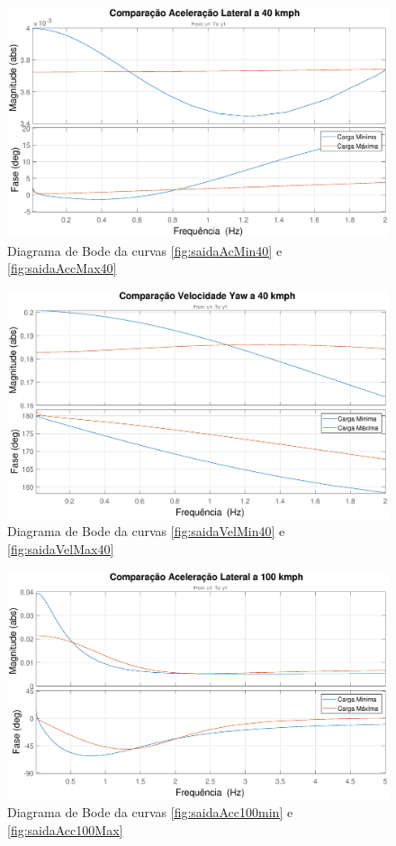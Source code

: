 \documentclass[a4paper, 12pt]{article}
\begin{document}
\begin{figure}[H]
\centering
\includegraphics[width=13cm]{imagens/acc40.eps}
\caption{Diagrama de Bode da curvas \ref{fig:saidaAcMin40} e \ref{fig:saidaAccMax40}}
\label{graf:sweep_sine}
\end{figure}
\begin{figure}[H]
\centering
\includegraphics[width=13cm]{imagens/yaw40.eps}
\caption{Diagrama de Bode da curvas \ref{fig:saidaVelMin40} e \ref{fig:saidaVelMax40}}
\label{graf:sweep_sine}
\end{figure}
\begin{figure}[H]
\centering
\includegraphics[width=13cm]{imagens/acc100.eps}
\caption{Diagrama de Bode da curvas \ref{fig:saidaAcc100min} e \ref{fig:saidaAcc100Max}}
\label{graf:sweep_sine}
\end{figure}
\end{document}
